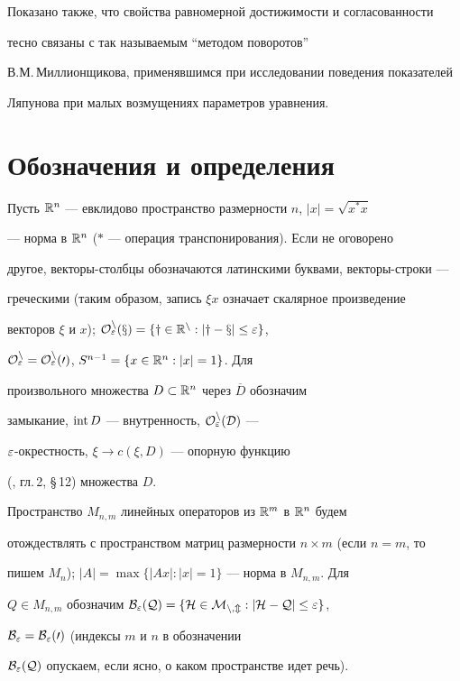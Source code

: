 Показано также, что свойства равномерной достижимости и согласованности


тесно связаны с так называемым ``методом поворотов''


В.М.\,Миллионщикова, применявшимся при исследовании поведения показателей


Ляпунова при малых возмущениях параметров уравнения.





\section{Обозначения и определения}





Пусть $\Bbb R^n$ --- евклидово пространство размерности $n$, $|x|=\sqrt{x^*x}$


--- норма в $\Bbb R^n$ ($*$ --- операция транспонирования). Если не оговорено


другое, векторы-столбцы обозначаются латинскими буквами, векторы-строки ---


греческими (таким образом, запись $\xi x$ означает скалярное произведение


векторов $\xi$ и $x$); $\cal O_{\varepsilon}^n(x)=\{y\in\Bbb R^n:|y-x|\le\varepsilon\}$,


$\cal O_{\varepsilon}^n=\cal O_{\varepsilon}^n(0)$, $S^{n-1}=\{x\in\Bbb R^n:|x|=1\}$. Для


произвольного множества $D\subset\Bbb R^n$ через $\overline D$ обозначим 


замыкание, $\operatorname{int} D$ --- внутренность, $\cal O_{\varepsilon}^n(D)$ ---


$\varepsilon$-окрестность, $\xi\to c(\xi,D)$ --- опорную функцию


(\cite{L}, гл.\,2, \S\,12) множества $D$.





Пространство $M_{n,m}$ линейных операторов из $\Bbb R^m$ в $\Bbb R^n$ будем


отождествлять с пространством матриц размерности $n\times m$ (если $n=m$, то


пишем $M_n$); $|A|=\max\{|Ax|: |x|=1\}$ --- норма в $M_{n,m}$.  Для


$Q\in M_{n,m}$ обозначим $\cal B_{\varepsilon}(Q)=\{H\in M_{n,m}:|H-Q|\le\varepsilon\}$,


$\cal B_{\varepsilon}=\cal B_{\varepsilon}(0)$ (индексы $m$ и $n$ в обозначении


$\cal B_{\varepsilon}(Q)$ опускаем, если ясно, о каком пространстве идет речь).






